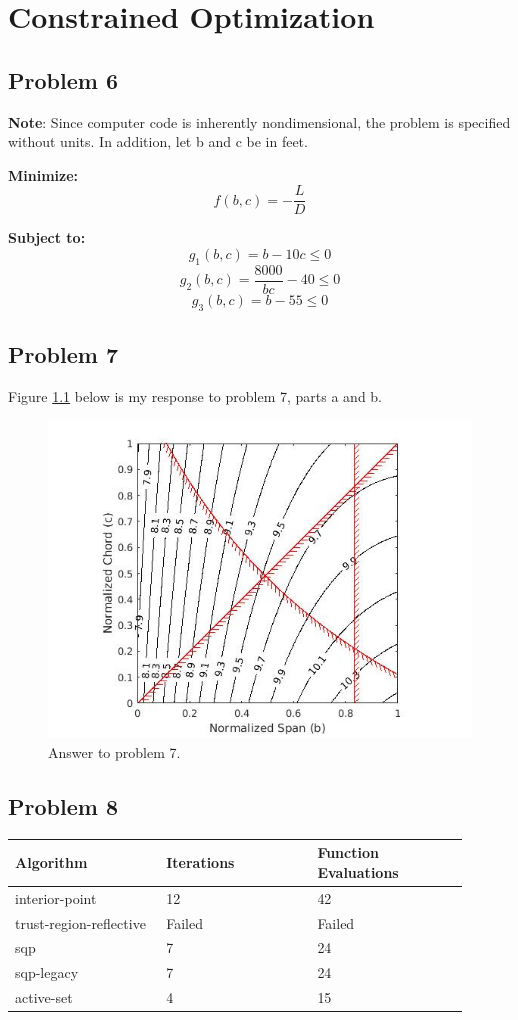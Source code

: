 \documentclass[twoside]{report} %
\begin{document}
\chapter{Constrained Optimization}
\section{Problem 6}

\textbf{Note}: Since computer code is inherently nondimensional, the problem is specified without
units. In addition, let b and c be in feet.


\textbf{Minimize:}
\[ f(b,c) = -\frac{L}{D} \]

\textbf{Subject to:}
\[ g_1(b,c) = b - 10c \leq 0\]
\[ g_2(b,c) = \frac{8000}{bc} - 40 \leq 0\]
\[ g_3(b,c) = b - 55 \leq 0 \]

\section{Problem 7}
Figure \ref{LonDplot} below is my response to problem 7, parts a and b.

\begin{figure}
\includegraphics[width = \linewidth]{LonDplot.jpg}
\centering
\caption{Answer to problem 7.}
\label{LonDplot}
\end{figure}

\cleardoublepage

\section{Problem 8}
\begin{tabular}{p{0.3\linewidth}|p{0.3\linewidth}|p{0.3\linewidth}}
Algorithm & Iterations & Function Evaluations \\
\hline
interior-point & 12 & 42 \\
trust-region-reflective & Failed & Failed \\
sqp & 7 & 24 \\
sqp-legacy & 7 & 24 \\
active-set & 4 & 15 \\
\end{tabular}
\\
\end{document}
